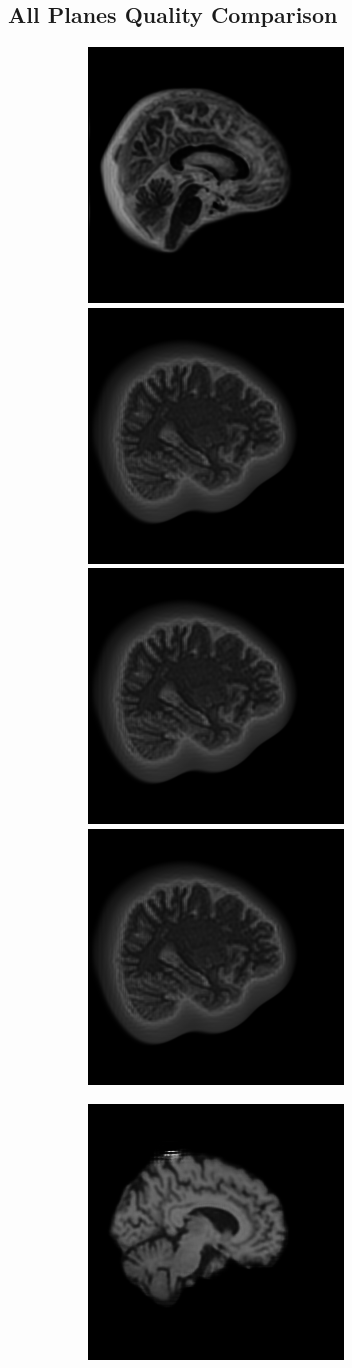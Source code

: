 \documentclass[12pt, fleqn, titlepage]{article}
\newcommand\skipper{1.4pt}
\newcommand\ripper{2.5pt}
\begin{document}
\subsection{All Planes Quality Comparison}\label{all_generated}
\begin{figure}[H]
	\centering
	\begin{subfigure}[b]{0.7\textwidth}
		\centering
		\includegraphics[width=0.22\linewidth]{imgs/1.5T_bilinear}
		\hskip\skipper
		\includegraphics[width=0.22\linewidth]{imgs/3T_bilinear}
		\hskip\skipper
		\includegraphics[width=0.22\linewidth]{imgs/3T_bilinear}
		\hskip\skipper
		\includegraphics[width=0.22\linewidth]{imgs/3T_bilinear}
	\end{subfigure}
	\vskip\ripper
	\begin{subfigure}[b]{0.7\textwidth}
		\centering
		\includegraphics[width=0.22\linewidth]{imgs/1.5T_no_noise}

\end{subfigure}
\end{figure}
\end{document}
